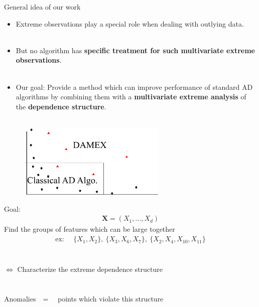 \documentclass[10pt]{beamer}
\def\mb{\mathbf}
\begin{document}
\begin{frame}
\begin{alertblock}{General idea of our work}
\begin{itemize}
\item Extreme observations play a special role when dealing with outlying data.\\~\\
\item But no algorithm has \textbf{specific treatment for such multivariate extreme observations}.\\~\\
\item Our goal: Provide a method which can improve performance of standard AD algorithms by combining them with a \textbf{multivariate extreme analysis} of the \textbf{dependence structure}.\\~\\
\end{itemize}
\end{alertblock}
\end{frame}

\begin{frame}
\begin{figure}
\centering
\includegraphics[height=3.5cm]{sourcefigs/extreme_AD.png}
\end{figure}
\end{frame}


\begin{frame}
\centering
{\LARGE Goal:}\\
\begin{align*}
\mb X = (X_1,\ldots,X_d)
\end{align*}
{\Large Find the groups of features which can be large together}
\begin{align*}
\text{ex:~~~~}\{X_1, X_2\},~\{X_3, X_6, X_7\},~\{X_2,X_4,X_{10},X_{11}\}
\end{align*}
~\\~\\
$\Leftrightarrow$ \Large{Characterize the extreme dependence structure}\\~\\~\\

Anomalies~~=~~ points which violate this structure

\end{frame}
\end{document}
